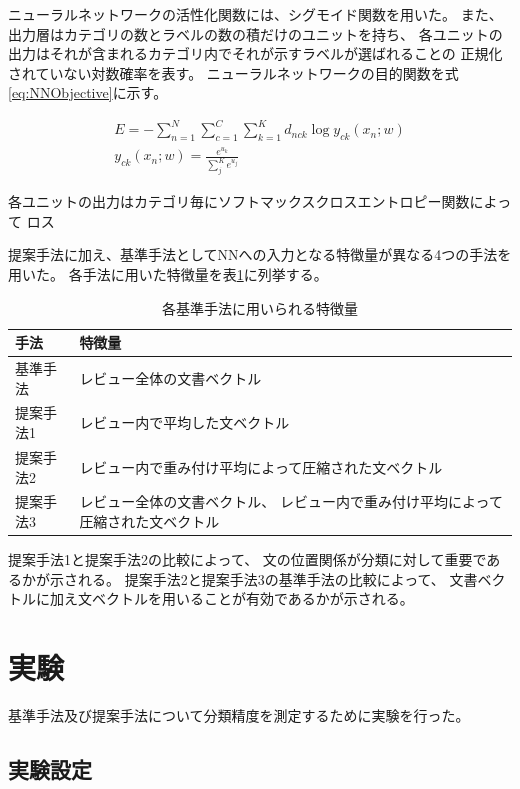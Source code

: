 \documentclass{ttithesis}
\begin{document}
ニューラルネットワークの活性化関数には、シグモイド関数を用いた。
また、出力層はカテゴリの数とラベルの数の積だけのユニットを持ち、
各ユニットの出力はそれが含まれるカテゴリ内でそれが示すラベルが選ばれることの
正規化されていない対数確率を表す。
ニューラルネットワークの目的関数を式\ref{eq:NNObjective}に示す。

\begin{gather}
  E = - \sum^{N}_{n = 1} \sum^{C}_{c = 1} \sum^{K}_{k = 1}
        d_{nck} \log{y_{ck}(x_n; w)}
  \label{eq:NNObjective} \\
  y_{ck}(x_n; w) = \frac{e^{u_k}}{\sum^{K}_{j} e^{u_j}}
\end{gather}

各ユニットの出力はカテゴリ毎にソフトマックスクロスエントロピー関数によって
ロス




提案手法に加え、基準手法としてNNへの入力となる特徴量が異なる4つの手法を用いた。
各手法に用いた特徴量を表\ref{tab:MethodFeatures}に列挙する。

\begin{table}
  \caption{各基準手法に用いられる特徴量}
  \begin{tabular}{l | l}\label{tab:MethodFeatures}
    手法 & 特徴量 \\
    \hline
    基準手法  & レビュー全体の文書ベクトル \\
    提案手法1 & レビュー内で平均した文ベクトル \\
    提案手法2 & レビュー内で重み付け平均によって圧縮された文ベクトル \\
    提案手法3 & レビュー全体の文書ベクトル、
        レビュー内で重み付け平均によって圧縮された文ベクトル \\
  \end{tabular}
\end{table}

提案手法1と提案手法2の比較によって、
文の位置関係が分類に対して重要であるかが示される。
提案手法2と提案手法3の基準手法の比較によって、
文書ベクトルに加え文ベクトルを用いることが有効であるかが示される。


\section{実験}

基準手法及び提案手法について分類精度を測定するために実験を行った。


\subsection{実験設定}
\end{document}

